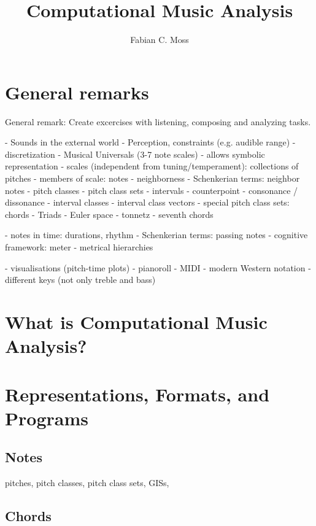 \documentclass{book}
\title{Computational Music Analysis}
\author[1,*]{Fabian C. Moss}
\affil[1]{École Polytechnique Fédérale de Lausanne}
\affil[*]{fabian.moss@epfl.ch}
\begin{document}
\maketitle 

\tableofcontents

\chapter{General remarks}

General remark: Create excercises with listening, composing and analyzing tasks.

- Sounds in the external world
- Perception, constraints (e.g. audible range)
- discretization
  - Musical Universals (3-7 note scales)
  - allows symbolic representation
- scales (independent from tuning/temperament): collections of pitches
- members of scale: notes
  - neighborness
  - Schenkerian terms: neighbor notes
  - pitch classes
  - pitch class sets
- intervals
  - counterpoint
  - consonance / dissonance
  - interval classes
  - interval class vectors
- special pitch class sets: chords
  - Triads
  - Euler space
  - tonnetz
  - seventh chords

- notes in time: durations, rhythm
  - Schenkerian terms: passing notes
  - cognitive framework: meter
  - metrical hierarchies
  
- visualisations (pitch-time plots)
  - pianoroll
  - MIDI
  - modern Western notation
  - different keys (not only treble and bass)


\chapter{What is Computational Music Analysis?}

\citep{horton_compositionality_2001}

\chapter{Representations, Formats, and Programs}

\section{Notes}

pitches, pitch classes, pitch class sets, GISs, 

\section{Chords}
\end{document}
